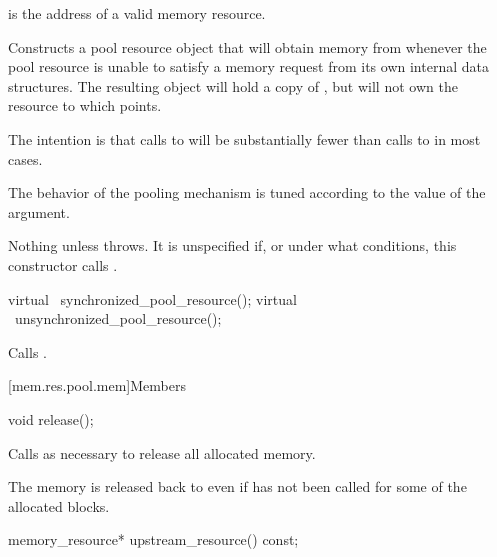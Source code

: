 \begin{itemdescr}
\pnum
\expects
{} is the address of a valid memory resource.

\pnum
\effects
Constructs a pool resource object that will obtain memory from 
whenever the pool resource is unable to satisfy a memory request
from its own internal data structures.
The resulting object will hold a copy of ,
but will not own the resource to which  points.
\begin{note}
The intention is that calls to 
will be substantially fewer than calls to 
in most cases.
\end{note}
The behavior of the pooling mechanism is tuned
according to the value of the  argument.

\pnum
\throws
Nothing unless  throws.
It is unspecified if, or under what conditions,
this constructor calls .
\end{itemdescr}

%
%
\begin{itemdecl}
virtual ~synchronized_pool_resource();
virtual ~unsynchronized_pool_resource();
\end{itemdecl}

\begin{itemdescr}
\pnum
\effects
Calls .
\end{itemdescr}

[mem.res.pool.mem]{Members}

%
%
\begin{itemdecl}
void release();
\end{itemdecl}

\begin{itemdescr}
\pnum
\effects
Calls  as necessary
to release all allocated memory.
\begin{note}
The memory is released back to 
even if  has not been called
for some of the allocated blocks.
\end{note}
\end{itemdescr}

%
%
\begin{itemdecl}
memory_resource* upstream_resource() const;
\end{itemdecl}

